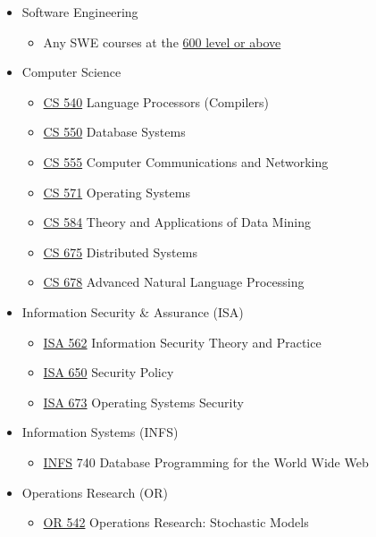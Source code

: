\documentclass[oneside,11pt]{memoir}
\begin{document}
\begin{itemize} 
\item Software Engineering
\begin{itemize}
    \item Any SWE courses at the \href{https://catalog.gmu.edu/courses/swe/}{600 level or above}
\end{itemize}
\item Computer Science

\begin{itemize}
    \item \href{https://catalog.gmu.edu/search/?P=CS%20540}{CS 540} Language Processors (Compilers)
    \item \href{https://catalog.gmu.edu/search/?P=CS%20550}{CS 550} Database Systems
    \item \href{https://catalog.gmu.edu/search/?P=CS%20555}{CS 555} Computer Communications and Networking
    \item \href{https://catalog.gmu.edu/search/?P=CS%20571}{CS 571} Operating Systems
    \item \href{https://catalog.gmu.edu/search/?P=CS%20584}{CS 584} Theory and Applications of Data Mining
    \item \href{https://catalog.gmu.edu/search/?P=CS%20675}{CS 675} Distributed Systems
    \item \href{https://catalog.gmu.edu/search/?P=CS%20678}{CS 678} Advanced Natural Language Processing
\end{itemize}

\item Information Security \& Assurance (ISA)

\begin{itemize}
    \item \href{https://catalog.gmu.edu/search/?P=ISA%20562}{ISA 562} Information Security Theory and Practice
    \item \href{https://catalog.gmu.edu/search/?P=ISA%20650}{ISA 650} Security Policy
    \item \href{https://catalog.gmu.edu/search/?P=ISA%20673}{ISA 673} Operating Systems Security
\end{itemize}

\item Information Systems (INFS)
\begin{itemize}
    \item \href{https://catalog.gmu.edu/search/?P=INFS%20740}{INFS} 740 Database Programming for the World Wide Web
\end{itemize}

\item Operations Research (OR)
\begin{itemize}
    \item \href{https://catalog.gmu.edu/search/?P=OR%20542}{OR 542} Operations Research: Stochastic Models
\end{itemize}

\end{itemize}
\end{document}
